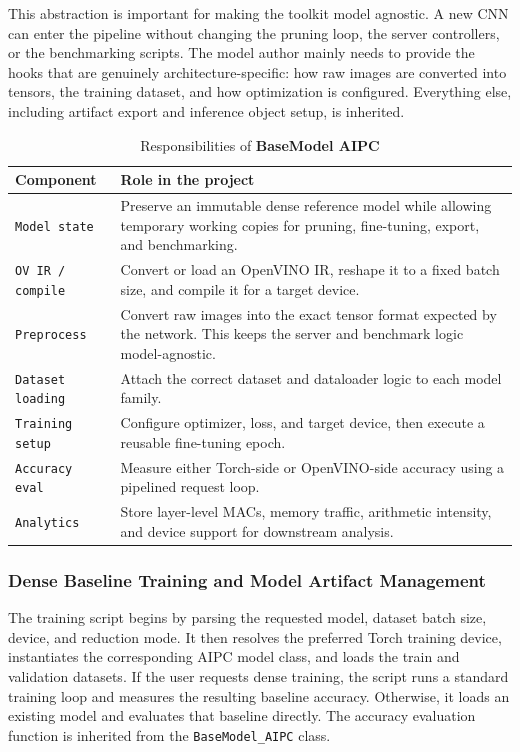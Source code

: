 \documentclass[conference]{IEEEtran}
\begin{document}
This abstraction is important for making the toolkit model agnostic. A new CNN can enter the pipeline without changing the pruning loop, the server controllers, or the benchmarking scripts. The model author mainly needs to provide the hooks that are genuinely architecture-specific: how raw images are converted into tensors, the training dataset, and how optimization is configured. Everything else, including artifact export and inference object setup, is inherited.

\begin{table}[t]
\caption{Responsibilities of \textbf{BaseModel AIPC}}
\label{tab:base-model}
\centering
\begin{tabularx}{\columnwidth}{|>{\raggedright\arraybackslash}p{}|X|}
\hline
Component & Role in the project \\
\hline 
\texttt{Model state} & Preserve an immutable dense reference model while allowing temporary working copies for pruning, fine-tuning, export, and benchmarking. \\
\hline
\texttt{OV IR / compile} & Convert or load an OpenVINO IR, reshape it to a fixed batch size, and compile it for a target device. \\
\hline
\texttt{Preprocess} & Convert raw images into the exact tensor format expected by the network. This keeps the server and benchmark logic model-agnostic. \\
\hline
\texttt{Dataset loading} & Attach the correct dataset and dataloader logic to each model family. \\
\hline
\texttt{Training setup} & Configure optimizer, loss, and target device, then execute a reusable fine-tuning epoch. \\
\hline
\texttt{Accuracy eval} & Measure either Torch-side or OpenVINO-side accuracy using a pipelined request loop. \\
\hline
\texttt{Analytics} & Store layer-level MACs, memory traffic, arithmetic intensity, and device support for downstream analysis. \\
\hline
\end{tabularx}
\end{table}

\subsubsection{Dense Baseline Training and Model Artifact Management}
The training script begins by parsing the requested model, dataset batch size, device, and reduction mode. It then resolves the preferred Torch training device, instantiates the corresponding AIPC model class, and loads the train and validation datasets. If the user requests dense training, the script runs a standard training loop and measures the resulting baseline accuracy. Otherwise, it loads an existing model and evaluates that baseline directly. The accuracy evaluation function is inherited from the \texttt{BaseModel\_AIPC} class.
\end{document}
